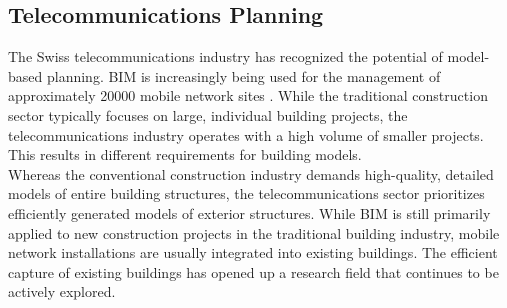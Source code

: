 \begin{comment}
in der schweizer telekommunikationsbranche wurde das potential der modellbasierten planung erkannt. für die bewirtschaftung der knapp 20000 mobilfunkanlagen wird zunehmend auf BIM gesetzt \cite{federalofficeofcommunicationsofcomLocationsMobilePhone}. Während in der klassischen baubranche meist mit einzelnen, grossen bauprojekten gearbeitet wird, arbeitet die telekommunikationsbranche mit einer grossen anzahl kleinerer projekten. daraus lassen sich unterschiedliche anforderungen an die gebäudemodelle ableiten. Während in der klassischen baubranche ein qualitativ hochstehendes und detailiertes modell der gebäudegesamtstruktur benötigt wird, ist dies in der telekommunikationsbranche ein effizient generiertes modell der aussenstruktur. während BIM in der klassischen baubranche noch immer primär für neubauten zur anwendung kommt, werden mobilfunkanlagen in der regel in bestandsbauten integriert. die effiziente erfassung von bestandsbauten eröffnete ein forschunsggebiet, das nach wie vor aktiv erforscht wird.\\
\end{comment}
\subsection{Telecommunications Planning}
The Swiss telecommunications industry has recognized the potential of model-based planning. BIM is increasingly being used for the management of approximately 20000 mobile network sites \cite{federalofficeofcommunicationsofcomLocationsMobilePhone}. While the traditional construction sector typically focuses on large, individual building projects, the telecommunications industry operates with a high volume of smaller projects. This results in different requirements for building models. \\
Whereas the conventional construction industry demands high-quality, detailed models of entire building structures, the telecommunications sector prioritizes efficiently generated models of exterior structures. While BIM is still primarily applied to new construction projects in the traditional building industry, mobile network installations are usually integrated into existing buildings. The efficient capture of existing buildings has opened up a research field that continues to be actively explored.

\begin{comment}
Der prozess, bei dem ein physisches objekt mittels terrestrischem laserscanning oder photogrammetrie in ein bim modell (as-is BIM) überführt wird, wird in der literatur häufig als scan-to-BIM bezeichnet (reverse engineering). während der erfassungsvorgang relativ schnell geschieht, kann die nachbearbeitung der punktwolken bei manueller modellierung zeitaufwändig werden. für eine effizienzsteigerung sind automatisierte verfahren gefragt.
\end{comment}
